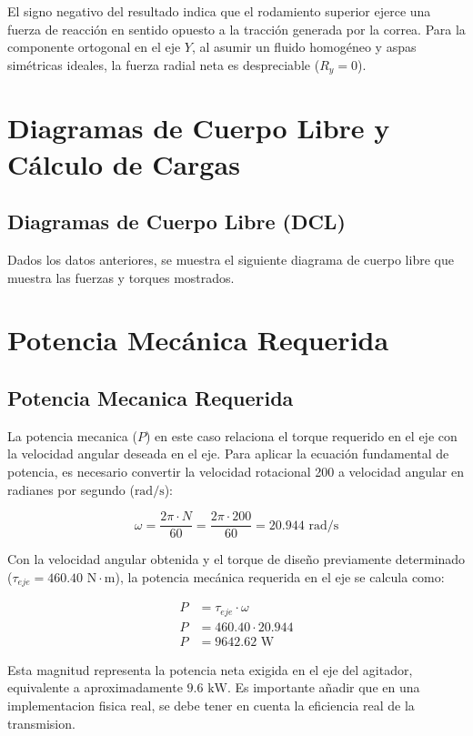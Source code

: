\documentclass[12pt, a4paper]{article}
\begin{document}
El signo negativo del resultado indica que el rodamiento superior ejerce una fuerza de reacción en sentido opuesto a la tracción generada por la correa. Para la componente ortogonal en el eje $Y$, al asumir un fluido homogéneo y aspas simétricas ideales, la fuerza radial neta es despreciable ($R_y = 0$).

\section{Diagramas de Cuerpo Libre y Cálculo de Cargas}
\subsection{Diagramas de Cuerpo Libre (DCL)}
Dados los datos anteriores, se muestra el siguiente diagrama de cuerpo libre que muestra las fuerzas y torques mostrados.

\section{Potencia Mecánica Requerida}
\subsection{Potencia Mecanica Requerida}
La potencia mecanica ($P$) en este caso relaciona el torque requerido en el eje con la velocidad angular deseada en el eje.
Para aplicar la ecuación fundamental de potencia, es necesario convertir la velocidad rotacional 200  a velocidad angular en radianes por segundo ($\text{rad/s}$):

\begin{equation}
    \omega = \frac{2\pi \cdot N}{60} = \frac{2\pi \cdot 200}{60} = 20.944 \text{ rad/s}
\end{equation}

Con la velocidad angular obtenida y el torque de diseño previamente determinado ($\tau_{eje} = 460.40 \text{ N}\cdot\text{m}$), la potencia mecánica requerida en el eje se calcula como:

\begin{align}
    P &= \tau_{eje} \cdot \omega \\[6pt]
    P &= 460.40 \cdot 20.944 \\[6pt]
    P &= 9642.62 \text{ W}
\end{align}

Esta magnitud representa la potencia neta exigida en el eje del agitador, equivalente a aproximadamente $9.6\text{ kW}$. Es importante añadir que en una implementacion fisica real, se debe tener en cuenta la eficiencia real de la transmision.
\end{document}
